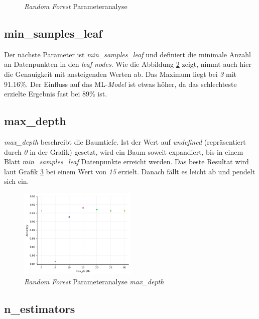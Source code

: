 \begin{figure}
\begin{subfigure}[c]{0.45\textwidth}
    \label{fig:rf_min_samples_leaf}
  \end{subfigure}
  \caption{\textit{Random Forest} Parameteranalyse}
\end{figure}

\subsection{min\_samples\_leaf}

Der nächste Parameter ist \textit{min\_samples\_leaf} und definiert die minimale Anzahl an Datenpunkten in den \textit{leaf nodes}. Wie die Abbildung \ref{fig:rf_min_samples_leaf} zeigt, nimmt auch hier die Genauigkeit mit ansteigenden Werten ab. Das Maximum liegt bei \textit{3} mit 91.16\%. Der Einfluss auf das ML-\textit{Model} ist etwas höher, da das schlechteste erzielte Ergebnis fast bei 89\% ist.

\subsection{max\_depth}

\textit{max\_depth} beschreibt die Baumtiefe. Ist der Wert auf \textit{undefined} (repräsentiert durch \textit{0} in der Grafik) gesetzt, wird ein Baum soweit expandiert, bis in einem Blatt \textit{min\_samples\_leaf} Datenpunkte erreicht werden. Das beste Resultat wird laut Grafik \ref{fig:rf_max_depth} bei einem Wert von \textit{15} erzielt. Danach fällt es leicht ab und pendelt sich ein.

\begin{figure}[htbp]
	\centering
	\includegraphics[width=0.5\textwidth]{images/max_depth.png}
	\caption{\textit{Random Forest} Parameteranalyse \textit{max\_depth}}
	\label{fig:rf_max_depth}
\end{figure}

\subsection{n\_estimators}

